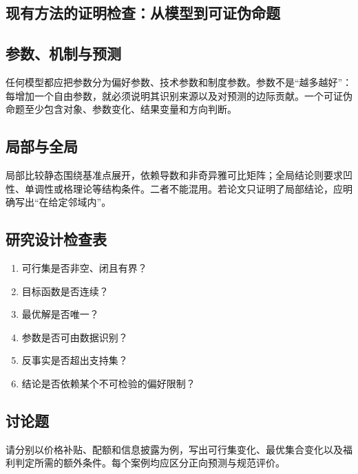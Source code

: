 \subsection{现有方法的证明检查：从模型到可证伪命题}
\subsection{参数、机制与预测}
任何模型都应把参数分为偏好参数、技术参数和制度参数。参数不是“越多越好”：每增加一个自由参数，就必须说明其识别来源以及对预测的边际贡献。一个可证伪命题至少包含对象、参数变化、结果变量和方向判断。

\subsection{局部与全局}
局部比较静态围绕基准点展开，依赖导数和非奇异雅可比矩阵；全局结论则要求凹性、单调性或格理论等结构条件。二者不能混用。若论文只证明了局部结论，应明确写出“在给定邻域内”。

\subsection{研究设计检查表}
\begin{enumerate}
\item 可行集是否非空、闭且有界？\item 目标函数是否连续？\item 最优解是否唯一？\item 参数是否可由数据识别？\item 反事实是否超出支持集？\item 结论是否依赖某个不可检验的偏好限制？
\end{enumerate}
\subsection{讨论题}
请分别以价格补贴、配额和信息披露为例，写出可行集变化、最优集合变化以及福利判定所需的额外条件。每个案例均应区分正向预测与规范评价。
